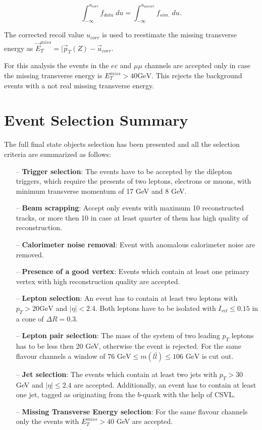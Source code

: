 \begin{equation}
 \int_{-\infty}^{u_{corr}} f_{data}\; du = \int_{-\infty}^{u_{uncorr}} f_{sim.}\; du.
\end{equation}

The corrected recoil value $u_{corr}$ is used to reestimate the missing transverse energy as $\vec{E}_{T}^{miss} = | \vec{p}_{T}(Z) - \vec{u}_{corr}$.

For this analysis the events in the $ee$ and $\mu\mu$ channels are accepted only in case the missing transverse energy is $E_{T}^{miss} > 40 \textrm{GeV}$. This rejects
the background events with a not real missing transverse energy.

\section{Event Selection Summary}

The full final state objects selection has been presented and all the selection criteria are summarized as follows:

\begin{itemize}
 \item [--] \textbf{Trigger selection}: The events have to be accepted by the dilepton triggers, which require the presents of two leptons, electrons or muons, with
 minimum transverse momentum of 17 GeV and 8 GeV. 
 \item [--] \textbf{Beam scrapping}: Accept only events with maximum 10 reconstructed tracks, or more then 10 in case at least quarter of them has high quality of reconstruction.
 \item [--] \textbf{Calorimeter noise removal}: Event with anomalous calorimeter noise are removed.
 \item [--] \textbf{Presence of a good vertex}: Events which contain at least one primary vertex with high reconstruction quality are accepted.
 \item [--] \textbf{Lepton selection}: An event has to contain at least two leptons with $p_{T} > 20 \textrm{GeV}$ and $|\eta| < 2.4$. Both leptons have to be isolated with 
 $I_{rel}\leq 0.15$ in a cone of $\Delta R = 0.3$.
 \item [--] \textbf{Lepton pair selection}: The mass of the system of two leading $p_{T}$ leptons has to be less then 20 GeV, otherwise the event is rejected. For the
 same flavour channels a window of $76\textrm{ GeV}\leq m(l\bar{l}) \leq 106\textrm{ GeV}$ is cut out.
 \item [--] \textbf{Jet selection}: The events which contain at least two jets with $p_{T} > 30$ GeV and $|\eta| \leq 2.4$ are accepted. Additionally, an event has to contain
 at least one jet, tagged as originating from the $b$-quark with the help of CSVL.
 \item [--] \textbf{Missing Transverse Energy selection}: For the same flavour channels only the events with $E_{T}^{miss} > 40$ GeV are accepted.
\end{itemize}

